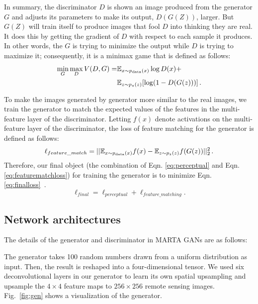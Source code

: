 \documentclass[journal]{IEEEtran}
\begin{document}
In summary, the discriminator $D$ is shown an image produced from the generator $G$ and adjusts its parameters to make its output, $D(G(Z))$, larger. But $G(Z)$ will train itself to produce images that fool $D$ into thinking they are real. It does this by getting the gradient of $D$ with respect to each sample it produces. In other words, the $G$ is trying to minimize the output while $D$ is trying to maximize it; consequently, it is a minimax game that is defined as follows:
\vspace{-1.5mm}
\begin{align}
\min_G \max_D V(D,G)=&{\mathbb E}_{x\sim p_{\rm data}(x)} \log D(x) +\nonumber\\
&{\mathbb E}_{z\sim p_z(z)}[\log (1-D(G(z)))]\,.
\label{eq:minmax}
\end{align}

To make the images generated by generator more similar to the real images, we train the generator to match the expected values of the features in the multi-feature layer of the discriminator. Letting $f(x)$ denote activations on the multi-feature layer of the discriminator, the loss of feature matching for the generator is defined as follows:
\begin{equation}
\ell_{feature\_match}=||{\mathbb E}_{x\sim p_{\rm data}(x)} f(x)-{\mathbb E}_{z\sim p_z(z)}f(G(z))||_2^2 \,.
\label{eq:featurematchloss}
\end{equation}
Therefore, our final object (the combination of Eqn. \ref{eq:perceptual} and Eqn. \ref{eq:featurematchloss}) for training the generator is to minimize Eqn. \ref{eq:finalloss}~. 
\begin{equation}
\ell_{final}=\ell_{perceptual}+ \ell_{feature\_matching}
\label{eq:finalloss}.
\end{equation}








\subsection{Network architectures}
\label{subsect:net arc}



The details of the generator and discriminator in MARTA GANs are as follows:


The generator takes 100 random numbers drawn from a uniform distribution as input.
Then, the result is reshaped into a four-dimensional tensor. We used six deconvolutional layers in our generator to learn its own spatial upsampling and upsample the $4\times 4$ feature maps to $256\times256$ remote sensing images.
Fig.~\ref{fig:gen} shows a visualization of the generator.
\end{document}
